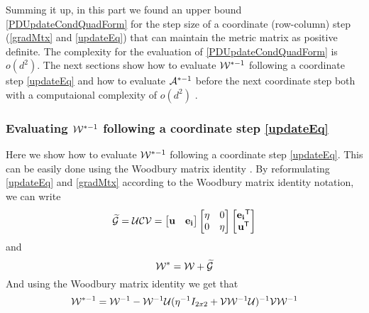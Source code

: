 Summing it up, in this part we found an upper bound \eqref{PDUpdateCondQuadForm} for the step size of a coordinate (row-column) step (\eqref{gradMtx} and \eqref{updateEq}) that can maintain the metric matrix as positive definite. The complexity for the evaluation of \eqref{PDUpdateCondQuadForm} is $o(d^2)$. The next sections show how to evaluate $\mathcal{W}^{*-1}$ following a coordinate step \eqref{updateEq} and how to evaluate $\mathcal{A}^{*-1}$ before the next coordinate step both with a computaional complexity of $o(d^2)$ .

\subsubsection{Evaluating $\mathcal{W}^{*-1}$ following a coordinate step \eqref{updateEq}}
Here we show how to evaluate $\mathcal{W}^{*-1}$ following a coordinate step \eqref{updateEq}. This can be easily done using the Woodbury matrix identity . By reformulating \eqref{updateEq} and \eqref{gradMtx} according to the Woodbury matrix identity notation, we can write
\begin{equation}
\mathcal{\widetilde{G}} = \mathcal{U}\mathcal{C}\mathcal{V} = \left[ \begin{matrix} \mathbf{u} & \mathbf{e_i} \end{matrix} \right] \left[ \begin{matrix} \eta & 0 \\ 0 & \eta \end{matrix} \right] \left[ \begin{matrix} \mathbf{e_i}{}^\mathsf{T} \\ \mathbf{u}{}^\mathsf{T} \end{matrix} \right]
\label{gradMtxWDB}
\end{equation}
and
\begin{equation}
\mathcal{W^*} = \mathcal{W}+\mathcal{\widetilde{G}}
\label{updateEqWDB}
\end{equation}
And using the Woodbury matrix identity we get that
\begin{equation}
\mathcal{W}^{*-1} = \mathcal{W}^{-1} - \mathcal{W}^{-1} \mathcal{U} (\eta^{-1} I_{2x2} + \mathcal{V} \mathcal{W}^{-1} \mathcal{U})^{-1} \mathcal{V} \mathcal{W}^{-1}
\label{InvWwdb}
\end{equation}


